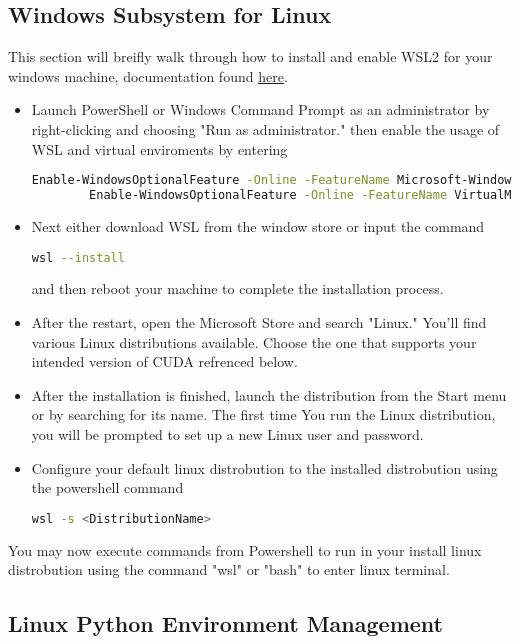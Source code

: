 \subsection{Windows Subsystem for Linux}
This section will breifly walk through how to install and enable WSL2 for your windows machine, documentation found \href{https://learn.microsoft.com/en-us/windows/wsl/install}{here}.
\begin{itemize}
	\item Launch PowerShell or Windows Command Prompt as an administrator by right-clicking and choosing "Run as administrator." then enable the usage of WSL and virtual enviroments by entering 
	\begin{lstlisting}[language=bash]
		Enable-WindowsOptionalFeature -Online -FeatureName Microsoft-Windows-Subsystem-Linux
		Enable-WindowsOptionalFeature -Online -FeatureName VirtualMachinePlatform\end{lstlisting}
	\item Next either download WSL from the window store or input the command
	 \begin{lstlisting}[language=bash]
	 	wsl --install\end{lstlisting} and then reboot your machine to complete the installation process.
	\item After the restart, open the Microsoft Store and search "Linux." You'll find various Linux distributions available. Choose the one that supports your intended version of CUDA refrenced below.
	\item After the installation is finished, launch the distribution from the Start menu or by searching for its name. The first time You run the Linux distribution, you will be prompted to set up a new Linux user and password.
	\item Configure your default linux distrobution to the installed distrobution using the powershell command \begin{lstlisting}[language=bash]
		wsl -s <DistributionName>\end{lstlisting}
\end{itemize}

You may now execute commands from Powershell to run in your install linux distrobution using the command "wsl" or "bash" to enter linux terminal.

\subsection{Linux Python Environment Management}

